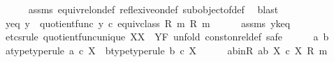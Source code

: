 \begin{isabellebody}
\ \ \ \ \isamarkupfalse%
\ assms\ equiv{\isacharunderscore}{\kern0pt}rel{\isacharunderscore}{\kern0pt}on{\isacharunderscore}{\kern0pt}def\ reflexive{\isacharunderscore}{\kern0pt}on{\isacharunderscore}{\kern0pt}def\ subobject{\isacharunderscore}{\kern0pt}of{\isacharunderscore}{\kern0pt}def{}\ \isamarkupfalse%
\ blast\isanewline
\isanewline
\ \ \isamarkupfalse%
\ y{\isacharunderscore}{\kern0pt}eq{\isacharcolon}{\kern0pt}\ {\isachardoublequoteopen}y\ {\isacharequal}{\kern0pt}\ quotient{\isacharunderscore}{\kern0pt}func\ {\isacharparenleft}{\kern0pt}y\ {\isasymcirc}\isactrlsub c\ equiv{\isacharunderscore}{\kern0pt}class\ {\isacharparenleft}{\kern0pt}R{\isacharcomma}{\kern0pt}\ m{\isacharparenright}{\kern0pt}{\isacharparenright}{\kern0pt}\ {\isacharparenleft}{\kern0pt}R{\isacharcomma}{\kern0pt}\ m{\isacharparenright}{\kern0pt}{\isachardoublequoteclose}\isanewline
\ \ \ \ \isamarkupfalse%
\ assms\ y{\isacharunderscore}{\kern0pt}k{\isacharunderscore}{\kern0pt}eq\isanewline
\ \ \isamarkupfalse%
\ {\isacharparenleft}{\kern0pt}etcs{\isacharunderscore}{\kern0pt}rule\ quotient{\isacharunderscore}{\kern0pt}func{\isacharunderscore}{\kern0pt}unique{\isacharbrackleft}{\kern0pt}\ X{\isacharequal}{\kern0pt}X{\isacharcomma}{\kern0pt}\ \ Y{\isacharequal}{\kern0pt}F{\isacharbrackright}{\kern0pt}{\isacharcomma}{\kern0pt}\ unfold\ const{\isacharunderscore}{\kern0pt}on{\isacharunderscore}{\kern0pt}rel{\isacharunderscore}{\kern0pt}def{\isacharcomma}{\kern0pt}\ safe{\isacharparenright}{\kern0pt}\isanewline
\ \ \ \ \isamarkupfalse%
\ a\ b\isanewline
\ \ \ \ \isamarkupfalse%
\ a{\isacharunderscore}{\kern0pt}type{\isacharbrackleft}{\kern0pt}type{\isacharunderscore}{\kern0pt}rule{\isacharbrackright}{\kern0pt}{\isacharcolon}{\kern0pt}\ {\isachardoublequoteopen}a\ {\isasymin}\isactrlsub c\ X{\isachardoublequoteclose}\ \ b{\isacharunderscore}{\kern0pt}type{\isacharbrackleft}{\kern0pt}type{\isacharunderscore}{\kern0pt}rule{\isacharbrackright}{\kern0pt}{\isacharcolon}{\kern0pt}\ {\isachardoublequoteopen}b\ {\isasymin}\isactrlsub c\ X{\isachardoublequoteclose}\isanewline
\ \ \ \ \isamarkupfalse%
\ ab{\isacharunderscore}{\kern0pt}in{\isacharunderscore}{\kern0pt}R{\isacharcolon}{\kern0pt}\ {\isachardoublequoteopen}{\isasymlangle}a{\isacharcomma}{\kern0pt}b{\isasymrangle}\ {\isasymin}\isactrlbsub X\ {\isasymtimes}\isactrlsub c\ X\isactrlesub \ {\isacharparenleft}{\kern0pt}R{\isacharcomma}{\kern0pt}\ m{\isacharparenright}{\kern0pt}{\isachardoublequoteclose}\isanewline

\end{isabellebody}
